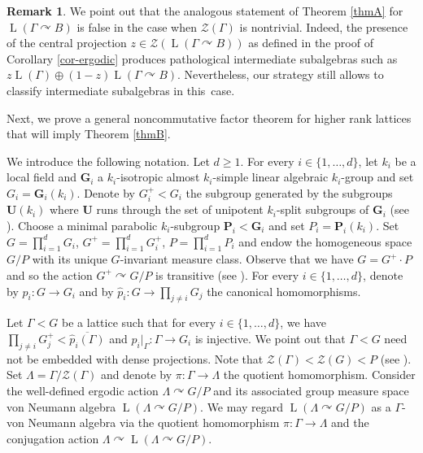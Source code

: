 \documentclass[JEP,XML,SOM,Unicode,published]{cedram}
\newcommand{\bG}{\boldsymbol{G}}
\newcommand{\bP}{\boldsymbol{P}}
\newcommand{\bU}{\boldsymbol{U}}
\theoremstyle{definition}
\newtheorem{rem}[thm]{Remark}
\DeclareMathOperator{\rL}{L}
\begin{document}
\begin{rem}
We point out that the analogous statement of Theorem \ref{thmA} for \hbox{$\rL(\Gamma \curvearrowright B)$} is false in the case when $\mathscr Z(\Gamma)$ is nontrivial. Indeed, the presence of the central projection $z \in \mathscr Z(\rL(\Gamma \curvearrowright B))$ as defined in the proof of Corollary \ref{cor-ergodic} produces pathological intermediate subalgebras such as $z \rL(\Gamma) \oplus (1-z)\rL(\Gamma \curvearrowright B)$. Nevertheless, our strategy still allows to classify intermediate subalgebras in this~case.
\end{rem}

Next, we prove a general noncommutative factor theorem for higher rank lattices that will imply Theorem \ref{thmB}.

We introduce the following notation. Let $d \geq 1$. For every $i \in \{1, \dots, d\}$, let $k_i$ be a local field and $\bG_i$ a $k_i$-isotropic almost $k_i$-simple linear algebraic $k_i$-group and set $G_i = \bG_i(k_i)$. Denote by $G_i^+ < G_i$ the subgroup generated by the subgroups $\bU(k_i)$ where $\bU$ runs through the set of unipotent $k_i$-split subgroups of $\bG_i$ (see \cite[Prop.\,I.5.4(i)]{Ma91}). Choose a minimal parabolic $k_i$-subgroup $\bP_i < \bG_i$ and set $P_i = \bP_i(k_i)$.
Set $G = \prod_{i = 1}^d G_i$, $G^+ = \prod_{i = 1}^d G_i^+$, $P = \prod_{i = 1}^d P_i$ and endow the homogeneous space $G/P$ with its unique $G$-invariant measure class. Observe that we have $G = G^+ \cdot P$ and so the action $G^+ \curvearrowright G/P$ is transitive (see \cite[Prop.\,I.5.4(vi)]{Ma91}). For every $i \in \{1, \dots, d\}$, denote by $p_i : G \to G_i$ and by $\widehat p_i : G \to \prod_{j \neq i} G_j$ the canonical homomorphisms.

Let $\Gamma < G$ be a lattice such that for every $i \in \{1, \dots, d\}$, we have $\prod_{j \neq i} G_j^+ < \overline{\widehat p_i(\Gamma)}$ and $p_i|_\Gamma : \Gamma \to G_i$ is injective. We point out that $\Gamma < G$ need not be embedded with dense projections. Note that $\mathscr Z(\Gamma) < \mathscr Z(G) < P$ (see \cite[Lem.\,II.6.3(I)]{Ma91}). Set $\Lambda = \Gamma/\mathscr Z(\Gamma)$ and denote by $\pi : \Gamma \to \Lambda$ the quotient homomorphism. Consider the well-defined ergodic action $\Lambda \curvearrowright G/P$ and its associated group measure space von Neumann algebra $\rL(\Lambda \curvearrowright G/P)$. We may regard $\rL(\Lambda \curvearrowright G/P)$ as a $\Gamma$-von Neumann algebra via the quotient homomorphism $\pi : \Gamma \to \Lambda$ and the conjugation action $\Lambda \curvearrowright \rL(\Lambda \curvearrowright G/P)$.
\end{document}
